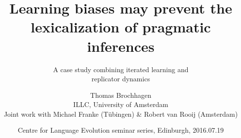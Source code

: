 \documentclass{beamer} %
\begin{document}
\renewcommand{\inserttotalframenumber}{29}
\title{Learning biases may prevent the lexicalization of pragmatic inferences}%
\subtitle{A case study combining iterated learning and\\ replicator dynamics }

\author{\center Thomas Brochhagen\\ILLC, University of Amsterdam\\
{\tiny Joint work with Michael Franke (T\"ubingen) \& Robert van Rooij (Amsterdam)}}

\date{\center \scriptsize Centre for Language Evolution seminar series, Edinburgh, 2016.07.19}
\end{document}
